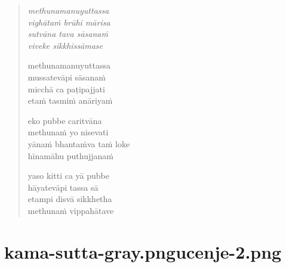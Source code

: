 

\cleartoverso

\vspace*{30mm}

\begin{verse}

\emph{methunamanuyuttassa}\\
\emph{vighātaṁ brūhi mārisa}\\
\emph{sutvāna tava sāsanaṁ}\\
\emph{viveke sikkhissāmase}

methunamanuyuttassa\\
mussatevāpi sāsanaṁ\\
micchā ca paṭipajjati\\
etaṁ tasmiṁ anāriyaṁ

eko pubbe caritvāna\\
methunaṁ yo nisevati\\
yānaṁ bhantaṁva taṁ loke\\
hīnamāhu puthujjanaṁ

yaso kitti ca yā pubbe\\
hāyatevāpi tassa sā\\
etampi disvā sikkhetha\\
methunaṁ vippahātave

\end{verse}


\chapter[Tissametteyya Sutta]{{kama-sutta-gray.png}{ucenje-2.png}}

